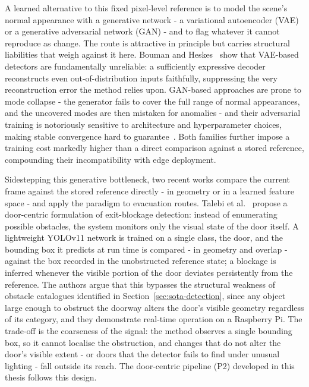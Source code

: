 A learned alternative to this fixed pixel-level reference is to model the
scene's normal appearance with a generative network - a variational
autoencoder (VAE) or a generative adversarial network (GAN) - and to flag
whatever it cannot reproduce as change. The route is attractive in principle
but carries structural liabilities that weigh against it here. Bouman and
Heskes~\cite{bouman2025autoencodersanomalydetectionunreliable} show that
VAE-based detectors are fundamentally unreliable: a sufficiently expressive
decoder reconstructs even out-of-distribution inputs faithfully, suppressing
the very reconstruction error the method relies upon. GAN-based approaches are
prone to mode collapse - the generator fails to cover the full range of normal
appearances, and the uncovered modes are then mistaken for anomalies - and
their adversarial training is notoriously sensitive to architecture and
hyperparameter choices, making stable convergence hard to
guarantee~\cite{Iglesias2023,Lin2024}. Both families further impose a training
cost markedly higher than a direct comparison against a stored reference,
compounding their incompatibility with edge deployment.

Sidestepping this generative bottleneck, two recent works compare the current
frame against the stored reference directly - in geometry or in a learned
feature space - and apply the paradigm to evacuation routes. Talebi et
al.~\cite{Talebi2026} propose a door-centric formulation of
exit-blockage detection: instead of enumerating possible obstacles, the system
monitors only the visual state of the door itself. A lightweight YOLOv11
network is trained on a single class, the door, and the bounding box it
predicts at run time is compared - in geometry and overlap - against the box
recorded in the unobstructed reference state; a blockage is inferred whenever
the visible portion of the door deviates persistently from the reference. The
authors argue that this bypasses the structural weakness of obstacle catalogues
identified in Section~\ref{sec:sota-detection}, since any object large enough
to obstruct the doorway alters the door's visible geometry regardless of its
category, and they demonstrate real-time operation on a Raspberry Pi. The
trade-off is the coarseness of the signal: the method observes a single
bounding box, so it cannot localise the obstruction, and changes that do not
alter the door's visible extent - or doors that the detector fails to find under
unusual lighting - fall outside its reach. The door-centric pipeline (P2)
developed in this thesis follows this design.

